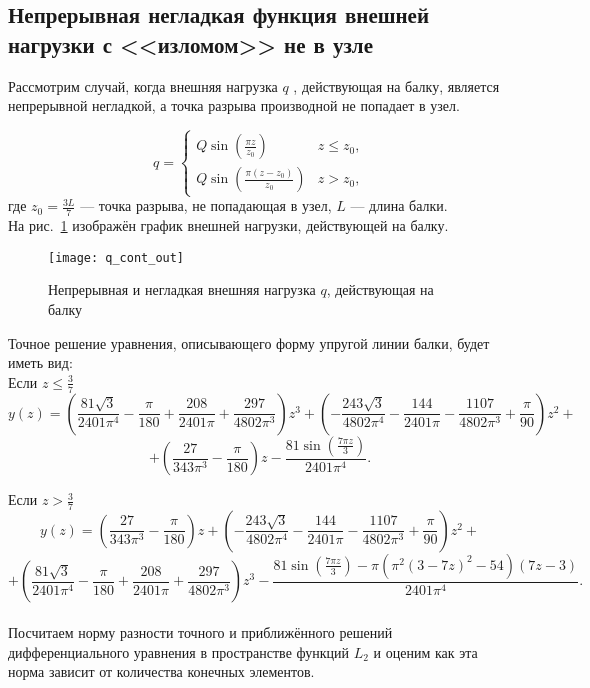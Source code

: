 \documentclass[12pt,a4paper]{article}
\begin{document}
\subsection{Непрерывная негладкая функция внешней нагрузки с <<изломом>> не в узле}

Рассмотрим случай, когда внешняя нагрузка $q$ , действующая на балку, является непрерывной негладкой, а точка разрыва производной не попадает в узел.
 
\[
q = 
 \begin{cases}
Q \sin \left(\frac{\pi  z}{z_{0}} \right)   &  z \leq z_{0}, \\
Q \sin \left(\frac{\pi  (z-z_{0})}{z_{0}} \right) & z > z_{0},
 \end{cases}
\]
где $z_{0}=\frac{3L}{7}$ --- точка разрыва, не попадающая в узел,  $L$ --- длина балки. \\

На рис.~\ref{fig:q_cont_out} изображён график внешней нагрузки, действующей на балку.
	\begin{figure}[H]
		\centering
		\texttt{[image: q\_cont\_out]}
		\caption{Непрерывная и негладкая внешняя нагрузка $q$, действующая на балку}
		\label{fig:q_cont_out}
	\end{figure}

Точное решение уравнения, описывающего форму упругой линии балки, будет иметь вид:\\

Если $z \leq \frac{3}{7}$ 
$$y(z)= \left(\frac{81 \sqrt{3}}{2401 \pi ^4}-\frac{\pi }{180}+\frac{208}{2401 \pi }+\frac{297}{4802 \pi ^3}\right) z^3+\left(-\frac{243 \sqrt{3}}{4802 \pi ^4}-\frac{144}{2401 \pi }-\frac{1107}{4802 \pi ^3}+\frac{\pi }{90}\right) z^2+$$
$$+\left(\frac{27}{343 \pi ^3}-\frac{\pi }{180}\right) z -\frac{81 \sin \left(\frac{7 \pi  z}{3}\right)}{2401 \pi ^4}.$$

Если $z > \frac{3}{7}$
$$  y(z)= \left(\frac{27}{343 \pi ^3}-\frac{\pi }{180}\right) z+\left(-\frac{243 \sqrt{3}}{4802 \pi ^4}-\frac{144}{2401 \pi }-\frac{1107}{4802 \pi ^3}+\frac{\pi }{90}\right) z^2+$$
$$+\left(\frac{81 \sqrt{3}}{2401 \pi ^4}-\frac{\pi }{180}+\frac{208}{2401 \pi }+\frac{297}{4802 \pi ^3}\right) z^3 - \frac{81 \sin \left(\frac{7 \pi  z}{3}\right)-\pi  \left(\pi ^2 (3-7 z)^2-54\right) (7 z-3)}{2401 \pi ^4}.$$ \\

Посчитаем норму разности точного и приближённого решений дифференциального уравнения в пространстве функций $L_{2}$  и оценим как эта норма зависит от количества конечных элементов.\\
\end{document}

